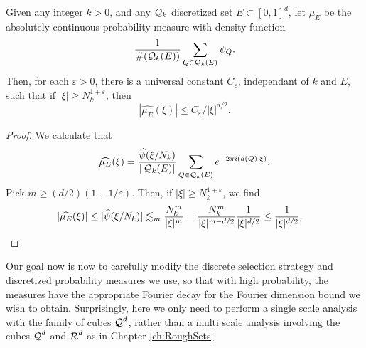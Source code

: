 \begin{lemma}
    Given any integer $k > 0$, and any $\operatorname{\mathcal{Q}}_k$ discretized set $E \subset [0,1]^d$, let $\mu_E$ be the absolutely continuous probability measure with density function
    \[ \frac{1}{\#(\operatorname{\mathcal{Q}}_k(E))} \sum_{Q \in \operatorname{\mathcal{Q}}_k(E)} \psi_Q. \]
    Then, for each $\varepsilon > 0$, there is a universal constant $C_\varepsilon$, independant of $k$ and $E$, such that if $|\xi| \geq N_k^{1 + \varepsilon}$, then
    \[ |\widehat{\mu_E}(\xi)| \leq C_\varepsilon / |\xi|^{d/2}. \]
\end{lemma}
\begin{proof}
    We calculate that
    \[ \widehat{\mu_E}(\xi) = \frac{\widehat{\psi}(\xi/N_k)}{|\operatorname{\mathcal{Q}}_k(E)|} \sum_{Q \in \operatorname{\mathcal{Q}}_k(E)} e^{-2 \pi i (a(Q) \cdot \xi)}. \]
    Pick $m \geq (d/2)(1 + 1/\varepsilon)$. Then, if $|\xi| \geq N_k^{1 + \varepsilon}$, we find
    \begin{align*}
        |\widehat{\mu_E}(\xi)| &\leq |\widehat{\psi}(\xi/N_k)| \lesssim_m \frac{N_k^m}{|\xi|^m} = \frac{N_k^m}{|\xi|^{m - d/2}} \frac{1}{|\xi|^{d/2}} \leq \frac{1}{|\xi|^{d/2}}. \qedhere
    \end{align*}
\end{proof}

Our goal now is now to carefully modify the discrete selection strategy and discretized probability measures we use, so that with high probability, the measures have the appropriate Fourier decay for the Fourier dimension bound we wish to obtain. Surprisingly, here we only need to perform a single scale analysis with the family of cubes $\operatorname{\mathcal{Q}}^d$, rather than a multi scale analysis involving the cubes $\operatorname{\mathcal{Q}}^d$ and $\operatorname{\mathcal{R}}^d$ as in Chapter \ref{ch:RoughSets}.


